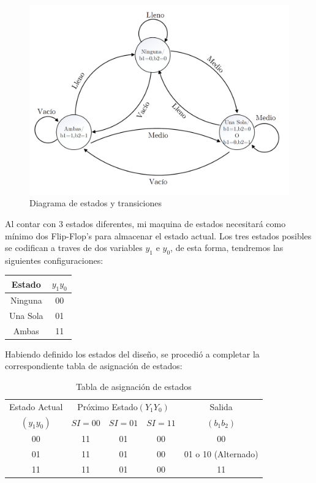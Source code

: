 \documentclass[10pt,a4paper]{article}
\begin{document}
\begin{figure}[H]
\centering
\includegraphics[scale=0.3]{images/diagrama_estados_moore.png}
\caption{Diagrama de estados y transiciones} \label{1_figa}
\end{figure}

Al contar con 3 estados diferentes, mi maquina de estados necesitará como mínimo dos Flip-Flop's para almacenar el estado actual. Los tres estados posibles se codifican a traves de dos variables $y_1$ e $y_0$, de esta forma, tendremos las siguientes configuraciones:

\bigskip

\begin{table}[ht]
	\centering
	\begin{tabular}{c|c}
	Estado & $y_1y_0$ \\ 
	\hline 
	Ninguna & 00 \\ 
	Una Sola & 01 \\ 
	Ambas & 11 \\ 
	\end{tabular} 
\end{table}


Habiendo definido los estados del diseño, se procedió a completar la correspondiente tabla de asignación de estados:
\bigskip
\begin{table}[ht]
	\centering
	\begin{tabular}{c|c|c|c|c}
	Estado Actual & \multicolumn{3}{c|}{Próximo Estado$(Y_1Y_0)$} & Salida\\
	\cline{2-4}
	$(y_1y_0)$ & $SI=00$ & $SI=01$ & $SI=11$ & $(b_1b_2)$\\
	\hline
	00 & 11 & 01 & 00 & 00 \\
	01 & 11 & 01 & 00 & 01 o 10 (Alternado) \\
	11 & 11 & 01 & 00 & 11 \\
	\end{tabular}
	\caption{Tabla de asignación de estados}
	\label{1_t1}
\end{table}
\end{document}
